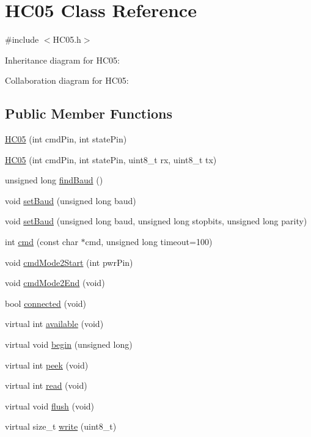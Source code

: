\hypertarget{class_h_c05}{}\section{H\+C05 Class Reference}
\label{class_h_c05}


{\ttfamily \#include $<$H\+C05.\+h$>$}



Inheritance diagram for H\+C05\+:


Collaboration diagram for H\+C05\+:
\subsection*{Public Member Functions}
\begin{DoxyCompactItemize}
\item 
\hyperlink{class_h_c05_a83b19c930533fcbfcdf5e9513a5eff34}{H\+C05} (int cmd\+Pin, int state\+Pin)
\item 
\hyperlink{class_h_c05_abb296bf1c53cb36471f0e7b274d83b91}{H\+C05} (int cmd\+Pin, int state\+Pin, uint8\+\_\+t rx, uint8\+\_\+t tx)
\item 
unsigned long \hyperlink{class_h_c05_a2a895622d5be48311a9fd5cde88e8bde}{find\+Baud} ()
\item 
void \hyperlink{class_h_c05_a5beea86ecd5d6a0647db9c7810c9a244}{set\+Baud} (unsigned long baud)
\item 
void \hyperlink{class_h_c05_a4526fd83bd5f39ad4c90ef41f364c5a9}{set\+Baud} (unsigned long baud, unsigned long stopbits, unsigned long parity)
\item 
int \hyperlink{class_h_c05_a02ff4f259f1a943bb85ecbd92a3b4024}{cmd} (const char $\ast$cmd, unsigned long timeout=100)
\item 
void \hyperlink{class_h_c05_aa0a68c876c2a7931b3af2eb98ed097f9}{cmd\+Mode2\+Start} (int pwr\+Pin)
\item 
void \hyperlink{class_h_c05_aa14e05ffa71b78bdbadc5c38e2ba4254}{cmd\+Mode2\+End} (void)
\item 
bool \hyperlink{class_h_c05_a8ae87aa80b4c9798bd3e0bfc1abcbe06}{connected} (void)
\item 
virtual int \hyperlink{class_h_c05_a059424e9d5089f88a722232c740d8257}{available} (void)
\item 
virtual void \hyperlink{class_h_c05_a3aaa4ce7b73ecc50060840f61f90018d}{begin} (unsigned long)
\item 
virtual int \hyperlink{class_h_c05_adb0ed1d0886866c1914ffe2d932feaf3}{peek} (void)
\item 
virtual int \hyperlink{class_h_c05_aa4aec5e063a8d4c5d71d167434574583}{read} (void)
\item 
virtual void \hyperlink{class_h_c05_ae639cba79b3673155d38fb4d7f73b542}{flush} (void)
\item 
virtual size\+\_\+t \hyperlink{class_h_c05_afa4d60dd4a25209c185aaa9f83c2f74a}{write} (uint8\+\_\+t)
\end{DoxyCompactItemize}
